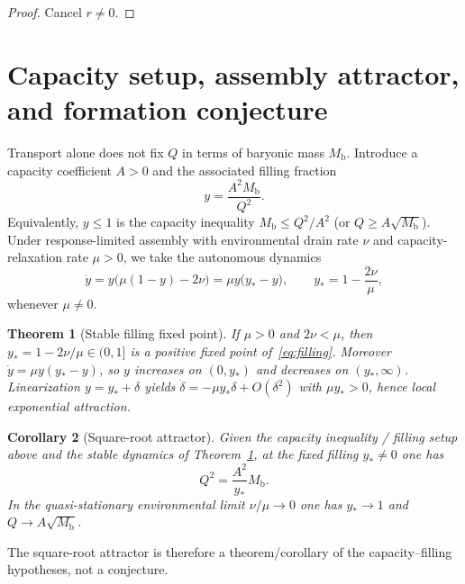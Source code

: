 \documentclass[11pt]{article}
\newtheorem{theorem}{Theorem}[section]
\newtheorem{corollary}[theorem]{Corollary}
\theoremstyle{definition}
\theoremstyle{remark}
\newcommand{\Mb}{M_{\mathrm{b}}}
\begin{document}
\begin{proof}
Cancel $r\neq0$.
\end{proof}

\section{Capacity setup, assembly attractor, and formation conjecture}
\label{sec:capacity}
Transport alone does not fix $Q$ in terms of baryonic mass $\Mb$.
Introduce a capacity coefficient $A>0$ and the associated filling fraction
\begin{equation}
  y=\frac{A^{2}\Mb}{Q^{2}}.
\end{equation}
Equivalently, $y\le1$ is the capacity inequality $\Mb\le Q^{2}/A^{2}$ (or $Q\ge A\sqrt{\Mb}$).
Under response-limited assembly with environmental drain rate $\nu$ and capacity-relaxation rate $\mu>0$, we take the autonomous dynamics
\begin{equation}
  \dot y=y\bigl(\mu(1-y)-2\nu\bigr)=\mu y\bigl(y_{\ast}-y\bigr),
  \qquad y_{\ast}=1-\frac{2\nu}{\mu},
  \label{eq:filling}
\end{equation}
whenever $\mu\neq0$.

\begin{theorem}[Stable filling fixed point]
\label{thm:filling-stable}
If $\mu>0$ and $2\nu<\mu$, then $y_{\ast}=1-2\nu/\mu\in(0,1]$ is a positive fixed point of~\eqref{eq:filling}.
Moreover $\dot y=\mu y(y_{\ast}-y)$, so $y$ increases on $(0,y_{\ast})$ and decreases on $(y_{\ast},\infty)$.
Linearization $y=y_{\ast}+\delta$ yields $\dot\delta=-\mu y_{\ast}\delta+O(\delta^{2})$ with $\mu y_{\ast}>0$, hence local exponential attraction.
\end{theorem}

\begin{corollary}[Square-root attractor]
\label{cor:sqrt-sat}
Given the capacity inequality / filling setup above and the stable dynamics of Theorem~\ref{thm:filling-stable}, at the fixed filling $y_{\ast}\neq0$ one has
\begin{equation}
  Q^{2}=\frac{A^{2}}{y_{\ast}}\Mb.
\end{equation}
In the quasi-stationary environmental limit $\nu/\mu\to0$ one has $y_{\ast}\to1$ and $Q\to A\sqrt{\Mb}$.
\end{corollary}

The square-root attractor is therefore a theorem/corollary of the capacity--filling hypotheses, not a conjecture.
\end{document}
